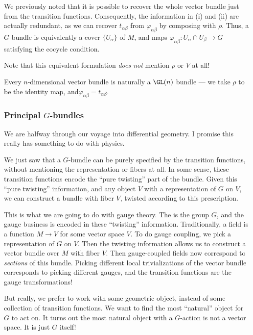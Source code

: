 \documentclass[a4paper]{article}
\begin{document}
We previously noted that it is possible to recover the whole vector bundle just from the transition functions. Consequently, the information in (i) and (ii) are actually redundant, as we can recover $t_{\alpha\beta}$ from $\varphi_{\alpha\beta}$ by composing with $\rho$. Thus, a $G$-bundle is equivalently a cover $\{U_\alpha\}$ of $M$, and maps $\varphi_{\alpha\beta}: U_\alpha \cap U_\beta \to G$ satisfying the cocycle condition.

Note that this equivalent formulation \emph{does not} mention $\rho$ or $V$ at all!

\begin{eg}
  Every $n$-dimensional vector bundle is naturally a $\GL(n)$ bundle --- we take $\rho$ to be the identity map, and$\varphi_{\alpha\beta} = t_{\alpha\beta}$.
\end{eg}

\subsubsection*{Principal \texorpdfstring{$G$}{G}-bundles}
We are halfway through our voyage into differential geometry. I promise this really has something to do with physics.

We just saw that a $G$-bundle can be purely specified by the transition functions, without mentioning the representation or fibers at all. In some sense, these transition functions encode the ``pure twisting'' part of the bundle. Given this ``pure twisting'' information, and any object $V$ with a representation of $G$ on $V$, we can construct a bundle with fiber $V$, twisted according to this prescription.

This is what we are going to do with gauge theory. The  is the group $G$, and the gauge business is encoded in these ``twisting'' information. Traditionally, a field is a function $M \to V$ for some vector space $V$. To do gauge coupling, we pick a representation of $G$ on $V$. Then the twisting information allows us to construct a vector bundle over $M$ with fiber $V$. Then gauge-coupled fields now correspond to \emph{sections} of this bundle. Picking different local trivializations of the vector bundle corresponds to picking different gauges, and the transition functions are the gauge transformations!

But really, we prefer to work with some geometric object, instead of some collection of transition functions. We want to find the most ``natural'' object for $G$ to act on. It turns out the most natural object with a $G$-action is not a vector space. It is just $G$ itself!
\end{document}
